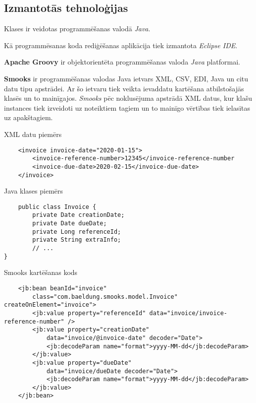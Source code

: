 \subsection{Izmantotās tehnoloģijas}
\par Klases ir veidotas programmēšanas valodā \textit{Java}.
\par Kā programmēsanas koda rediģēšanas aplikācija tiek izmantota \textit{Eclipse IDE}.
\par \textbf{Apache Groovy} ir objektorientēta programmēšanas valoda \textit{Java} platformai.
\par \textbf{Smooks} ir programmēšanas valodas Java ietvars XML, CSV, EDI, Java un citu datu tipu apstrādei. Ar šo ietvaru tiek veikta ievaddatu kartēšana atbilstošajās klasēs un to mainīgajos. \textit{Smooks} pēc noklusējuma apstrādā XML datus, kur klašu instances tiek izveidoti uz noteiktiem tagiem un to mainīgo vērtības tiek ielasītas uz apakštagiem.

\par XML datu piemērs
{
    \begin{verbatim}
    <invoice invoice-date="2020-01-15">
        <invoice-reference-number>12345</invoice-reference-number
        <invoice-due-date>2020-02-15</invoice-due-date>
    </invoice>
\end{verbatim}
}
\par Java klases piemērs
{
    \begin{verbatim}
    public class Invoice {
        private Date creationDate;
        private Date dueDate;
        private Long referenceId;
        private String extraInfo;
        // ...
}
\end{verbatim}
}
\par Smooks kartēšanas kods
{
\begin{verbatim}
    <jb:bean beanId="invoice"
        class="com.baeldung.smooks.model.Invoice" createOnElement="invoice">
        <jb:value property="referenceId" data="invoice/invoice-reference-number" />
        <jb:value property="creationDate"
            data="invoice/@invoice-date" decoder="Date">
            <jb:decodeParam name="format">yyyy-MM-dd</jb:decodeParam>
        </jb:value>
        <jb:value property="dueDate"
            data="invoice/dueDate decoder="Date">
            <jb:decodeParam name="format">yyyy-MM-dd</jb:decodeParam>
        </jb:value>
    </jb:bean>
\end{verbatim}
}
